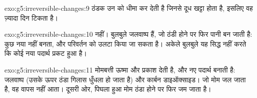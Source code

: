 \begin{solution}{exo:g5:irreversible-changes:9}
ठंडक उन  को धीमा कर देती है जिनसे दूध खट्टा होता है,
इसलिए वह ज़्यादा दिन टिकता है।
\end{solution}

\begin{solution}{exo:g5:irreversible-changes:10}
नहीं। बुलबुले जलवाष्प हैं, जो ठंडी होने पर फिर पानी बन जाती है: कुछ
नया नहीं बनता, और परिवर्तन को उलटा किया जा सकता है। अकेले बुलबुले यह
सिद्ध नहीं करते कि कोई नया पदार्थ प्रकट हुआ है।
\end{solution}

\begin{solution}{exo:g5:irreversible-changes:11}
 मोमबत्ती ऊष्मा और प्रकाश देती है, और नए पदार्थ बनाती है:
जलवाष्प (उसके ऊपर ठंडा गिलास धुँधला हो जाता है) और कार्बन डाइऑक्साइड।
जो मोम जल जाता है, वह वापस नहीं आता। दूसरी ओर, पिघला हुआ मोम ठंडा होने पर
फिर जम जाता है।
\end{solution}

